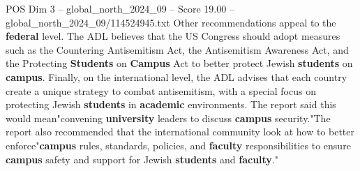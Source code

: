 \begin{textsample}{POS Dim 3 – global\_north\_2024\_09 – Score 19.00 – global\_north\_2024\_09/114524945.txt}
Other recommendations appeal to the \textbf{federal} level.
The ADL believes that the US Congress should adopt measures such as the Countering Antisemitism Act, the Antisemitism Awareness Act, and the Protecting \textbf{Students} on \textbf{Campus} Act to better protect Jewish \textbf{students} on \textbf{campus}.
Finally, on the international level, the ADL advises that each country create a unique strategy to combat antisemitism, with a special focus on protecting Jewish \textbf{students} in \textbf{academic} environments.
The report said this would mean"convening \textbf{university} leaders to discuss \textbf{campus} security."The report also recommended that the international community look at how to better enforce"\textbf{campus} rules, standards, policies, and \textbf{faculty} responsibilities to ensure \textbf{campus} safety and support for Jewish \textbf{students} and \textbf{faculty}."

\end{textsample}

